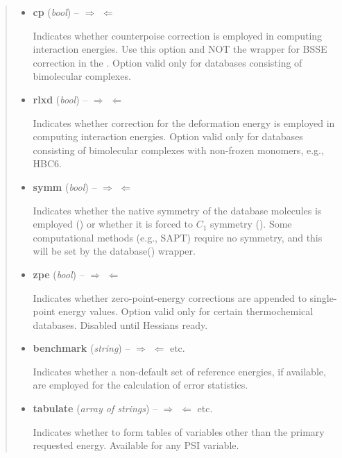 \documentclass[letterpaper,10pt,english]{sphinxmanual}
\begin{document}
\begin{fulllineitems}
\begin{quote}
\begin{description}
\begin{itemize}
\item {} 
\textbf{cp} (\emph{bool}) -- 
$\Rightarrow$  $\Leftarrow$ \textbar{}\textbar{} 

Indicates whether counterpoise correction is employed in computing
interaction energies. Use this option and NOT the {\hyperref[index:wrappers.cp]{}}
wrapper for BSSE correction in the .  Option
valid only for databases consisting of bimolecular complexes.


\item {} 
\textbf{rlxd} (\emph{bool}) -- 
$\Rightarrow$  $\Leftarrow$ \textbar{}\textbar{} 

Indicates whether correction for the deformation energy is
employed in computing interaction energies.  Option valid only for
databases consisting of bimolecular complexes with non-frozen
monomers, e.g., HBC6.


\item {} 
\textbf{symm} (\emph{bool}) -- 
$\Rightarrow$  $\Leftarrow$ \textbar{}\textbar{} 

Indicates whether the native symmetry of the database molecules is
employed () or whether it is forced to $C_1$ symmetry
(). Some computational methods (e.g., SAPT) require no
symmetry, and this will be set by the database() wrapper.


\item {} 
\textbf{zpe} (\emph{bool}) -- 
$\Rightarrow$  $\Leftarrow$ \textbar{}\textbar{} 

Indicates whether zero-point-energy corrections are appended to
single-point energy values. Option valid only for certain
thermochemical databases. Disabled until Hessians ready.


\item {} 
\textbf{benchmark} (\emph{string}) -- 
$\Rightarrow$  $\Leftarrow$ \textbar{}\textbar{}  \textbar{}\textbar{} etc.

Indicates whether a non-default set of reference energies, if
available, are employed for the calculation of error statistics.


\item {} 
\textbf{tabulate} (\emph{array of strings}) -- 
$\Rightarrow$ \code{{[}{]}} $\Leftarrow$ \textbar{}\textbar{}  \textbar{}\textbar{} etc.

Indicates whether to form tables of variables other than the
primary requested energy.  Available for any PSI variable.



\end{itemize}
\end{description}
\end{quote}
\end{fulllineitems}
\end{document}
